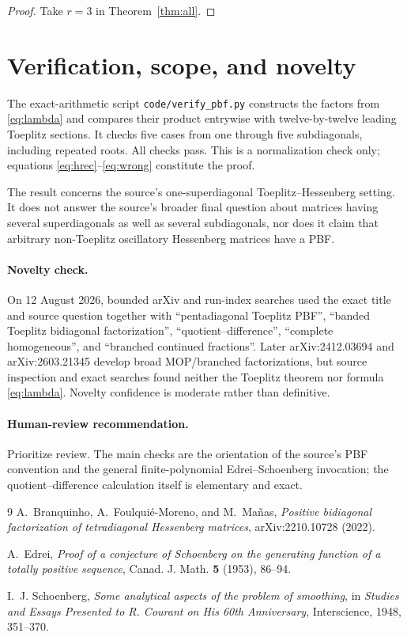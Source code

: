 \documentclass[11pt]{article}
\begin{document}
\begin{proof}
Take $r=3$ in Theorem~\ref{thm:all}.
\end{proof}

\section{Verification, scope, and novelty}
The exact-arithmetic script \texttt{code/verify\_pbf.py} constructs the
factors from \eqref{eq:lambda} and compares their product entrywise with
twelve-by-twelve leading Toeplitz sections.  It checks five cases from one
through five subdiagonals, including repeated roots.  All checks pass.  This
is a normalization check only; equations \eqref{eq:hrec}--\eqref{eq:wrong}
constitute the proof.

The result concerns the source's one-superdiagonal Toeplitz--Hessenberg
setting.  It does not answer the source's broader final question about
matrices having several superdiagonals as well as several subdiagonals, nor
does it claim that arbitrary non-Toeplitz oscillatory Hessenberg matrices have
a PBF.

\paragraph{Novelty check.}
On 12 August 2026, bounded arXiv and run-index searches used the exact title
and source question together with ``pentadiagonal Toeplitz PBF'', ``banded
Toeplitz bidiagonal factorization'', ``quotient--difference'', ``complete
homogeneous'', and ``branched continued fractions''.  Later
arXiv:2412.03694 and arXiv:2603.21345 develop broad MOP/branched
factorizations, but source inspection and exact searches found neither the
Toeplitz theorem nor formula \eqref{eq:lambda}.  Novelty confidence is
moderate rather than definitive.

\paragraph{Human-review recommendation.}
Prioritize review.  The main checks are the orientation of the source's PBF
convention and the general finite-polynomial Edrei--Schoenberg invocation;
the quotient--difference calculation itself is elementary and exact.

\begin{thebibliography}{9}
A.~Branquinho, A.~Foulquié-Moreno, and M.~Mañas,
\emph{Positive bidiagonal factorization of tetradiagonal Hessenberg
matrices}, arXiv:2210.10728 (2022).

A.~Edrei, \emph{Proof of a conjecture of Schoenberg on the generating
function of a totally positive sequence}, Canad. J. Math. \textbf{5} (1953),
86--94.

I.~J. Schoenberg, \emph{Some analytical aspects of the problem of smoothing},
in \emph{Studies and Essays Presented to R. Courant on His 60th Anniversary},
Interscience, 1948, 351--370.
\end{thebibliography}
\end{document}
